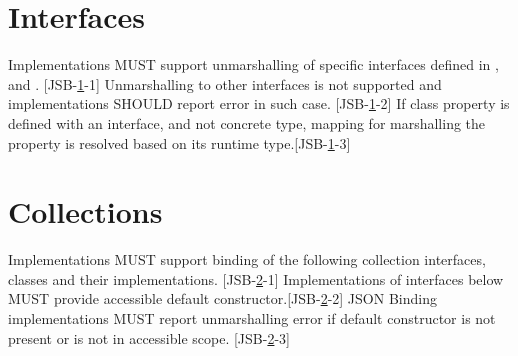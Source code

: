 \section{Interfaces}
\label{sec:interfaces}
Implementations MUST support unmarshalling of specific interfaces defined in  , and . [JSB-\ref{sec:interfaces}-1] Unmarshalling to other interfaces is not supported and implementations SHOULD report error in such case. [JSB-\ref{sec:interfaces}-2] If class property is defined with an interface, and not concrete type, mapping for marshalling the property is resolved based on its runtime type.[JSB-\ref{sec:interfaces}-3]

\section{Collections}
\label{sec:collections}
Implementations MUST support binding of the following collection interfaces, classes and their implementations. [JSB-\ref{sec:collections}-1] Implementations of interfaces below MUST provide accessible default constructor.[JSB-\ref{sec:collections}-2] JSON Binding implementations MUST report unmarshalling error if default constructor is not present or is not in accessible scope. [JSB-\ref{sec:collections}-3]

